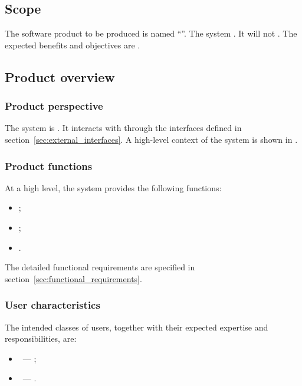 \documentclass[12pt,a4paper]{extarticle}
\begin{document}
\subsection{Scope}
\label{sec:scope}

The software product to be produced is named
\enquote{\ifhseHasNameEn\hseProjectNameEn\else\projectname\fi}.
The system . It will not
. The expected benefits and objectives
are .

\subsection{Product overview}

\subsubsection{Product perspective}

The system is .
It interacts with  through the
interfaces defined in section~\ref{sec:external_interfaces}. A high-level
context of the system is shown in .

\subsubsection{Product functions}

At a high level, the system provides the following functions:
\begin{itemize}[leftmargin=1.25cm]
    \item {};
    \item {};
    \item {}.
\end{itemize}
The detailed functional requirements are specified in
section~\ref{sec:functional_requirements}.

\subsubsection{User characteristics}

The intended classes of users, together with their expected expertise and
responsibilities, are:
\begin{itemize}[leftmargin=1.25cm]
    \item \textbf{}~--- ;
    \item \textbf{}~--- .
\end{itemize}
\end{document}
